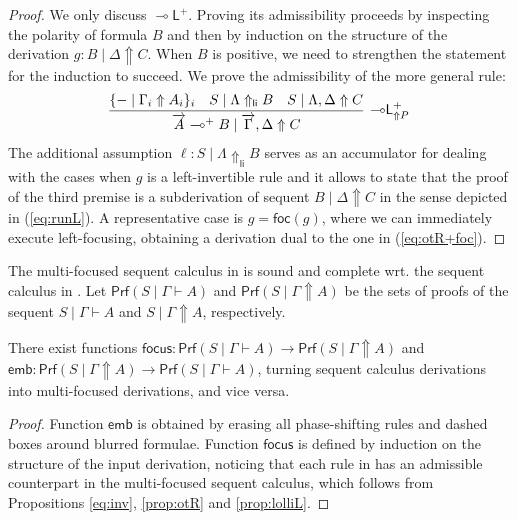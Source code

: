 \documentclass[runningheads]{llncs}
\renewcommand{\vec}{\overrightarrow}
\newcommand{\lleft}{{\multimap}\mathsf{L}}
\newcommand{\lolliL}{\lleft}
\newcommand{\lolli}{\multimap}
\renewcommand{\L}{\mathsf{L}}
\newcommand{\up}{\Uparrow}
\newcommand{\upl}{\Uparrow_{\mathsf{li}}}
\newcommand{\foc}{\mathsf{foc}}
\newcommand{\focus}{\mathsf{focus}}
\newcommand{\emb}{\mathsf{emb}}
\newcommand{\Prf}{\mathsf{Prf}}
\begin{document}
\begin{proof}
  We only discuss $\lolliL^+$. Proving its admissibility proceeds by inspecting the polarity of formula $B$ and then by induction on the structure of the derivation $g : B \mid \Delta \up C$. When $B$ is positive, we need to strengthen the statement for the induction to succeed. We prove the admissibility of the more general rule:
  \[
  \begin{array}{c}
    \infer[\lolliL^+_{\up P}]{\vec{A} \lolli^+ B \mid \vec{\Gamma} , \Delta \up C}{
      \{ - \mid \Gamma_i \up A_i \}_{i}
      &
      S\mid \Lambda \upl B
      &
      S \mid \Lambda,\Delta \up C
    }
  \end{array}
  \]
  The additional assumption $\ell:S\mid \Lambda \upl B$ serves as an accumulator for dealing with the cases when $g$ is a left-invertible rule
  and it allows to state that the proof of the third premise is a subderivation of sequent $B \mid \Delta \up C$ in the sense depicted in (\ref{eq:runL}). A representative case is $g = \foc(g)$, where we can immediately execute left-focusing, obtaining a derivation dual to the one in (\ref{eq:otR+foc}).
\end{proof}

The multi-focused sequent calculus in  is sound and complete wrt. the sequent calculus in . 
Let $\Prf(S \mid \Gamma \vdash A)$ and $\Prf(S \mid \Gamma \up A)$ be the sets of proofs of the sequent $S \mid \Gamma \vdash A$ and $S \mid \Gamma \up A$, respectively.
\begin{theorem}\label{thm}
  There exist functions $\focus : \Prf(S \mid \Gamma \vdash A) \to \Prf(S \mid \Gamma \up A)$  and $\emb: \Prf(S \mid \Gamma \up A) \to \Prf(S \mid \Gamma \vdash A)$, turning sequent calculus derivations into multi-focused derivations, and vice versa.
\end{theorem}
\begin{proof}
Function $\emb$ is obtained by erasing all phase-shifting rules and dashed boxes around blurred formulae. Function $\focus$ is defined by induction on the structure of the input derivation, noticing that each rule in  has an admissible counterpart in the multi-focused sequent calculus, which follows from Propositions \ref{eq:inv}, \ref{prop:otR} and \ref{prop:lolliL}.
\end{proof}
\end{document}
